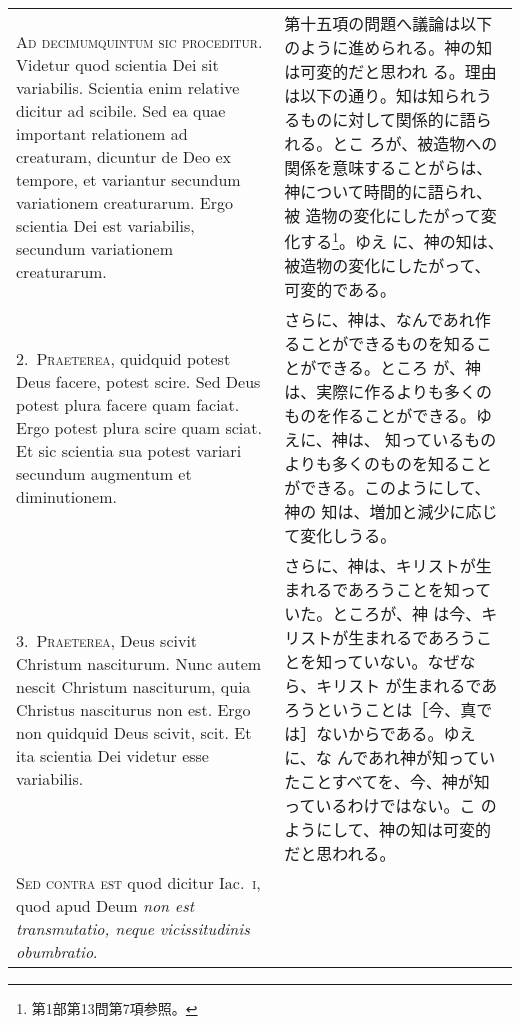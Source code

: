 \documentclass[10pt]{jsarticle} %
\begin{document}
\begin{longtable}{p{21em}p{21em}}


{\huge A}{\scshape d decimumquintum sic proceditur}. Videtur quod
scientia Dei sit variabilis. Scientia enim relative dicitur ad
scibile. Sed ea quae important relationem ad creaturam, dicuntur de
Deo ex tempore, et variantur secundum variationem creaturarum. Ergo
scientia Dei est variabilis, secundum variationem creaturarum.


&

第十五項の問題へ議論は以下のように進められる。神の知は可変的だと思われ
る。理由は以下の通り。知は知られうるものに対して関係的に語られる。とこ
ろが、被造物への関係を意味することがらは、神について時間的に語られ、被
造物の変化にしたがって変化する\footnote{第1部第13問第7項参照。}。ゆえ
に、神の知は、被造物の変化にしたがって、可変的である。


\\


{\scshape 2.~Praeterea}, quidquid potest Deus facere, potest
scire. Sed Deus potest plura facere quam faciat. Ergo potest plura
scire quam sciat. Et sic scientia sua potest variari secundum
augmentum et diminutionem.

&

さらに、神は、なんであれ作ることができるものを知ることができる。ところ
が、神は、実際に作るよりも多くのものを作ることができる。ゆえに、神は、
知っているものよりも多くのものを知ることができる。このようにして、神の
知は、増加と減少に応じて変化しうる。


\\


{\scshape 3.~Praeterea}, Deus scivit Christum nasciturum. Nunc autem
nescit Christum nasciturum, quia Christus nasciturus non est. Ergo non
quidquid Deus scivit, scit. Et ita scientia Dei videtur esse
variabilis.

&

さらに、神は、キリストが生まれるであろうことを知っていた。ところが、神
は今、キリストが生まれるであろうことを知っていない。なぜなら、キリスト
が生まれるであろうということは［今、真では］ないからである。ゆえに、な
んであれ神が知っていたことすべてを、今、神が知っているわけではない。こ
のようにして、神の知は可変的だと思われる。

\\


{\scshape Sed contra est} quod dicitur Iac.~{\scshape i}, quod apud
Deum {\itshape non est transmutatio, neque vicissitudinis obumbratio}.


\end{longtable}
\end{document}
